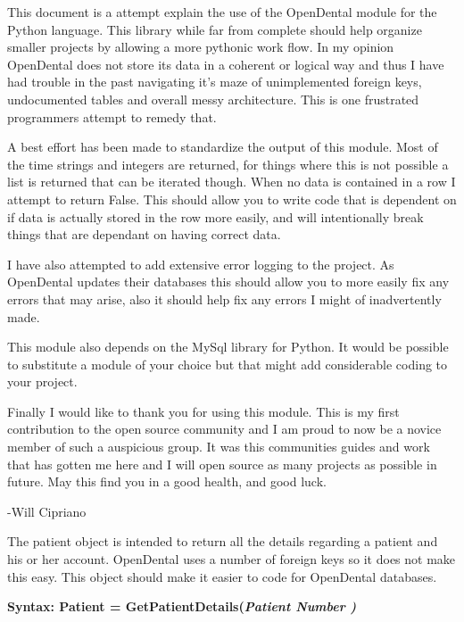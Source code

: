 \documentclass[10pt,a4paper]{article}
\begin{document}
\vspace*{\fill}
This document is a attempt explain the use of the OpenDental module for the Python language. This library while far from complete should help organize smaller projects by allowing a more pythonic work flow. In my opinion OpenDental does not store its data in a coherent or logical way and thus I have had trouble in the past navigating it's maze of unimplemented foreign keys, undocumented tables and overall messy architecture. This is one frustrated programmers attempt to remedy that.

A best effort has been made to standardize the output of this module. Most of the time strings and integers are returned, for things where this is not possible a list is returned that can be iterated though. When no data is contained in a row I attempt to return False. This should allow you to write code that is dependent on if data is actually stored in the row more easily, and will intentionally break things that are dependant on having correct data.

I have also attempted to add extensive error logging to the project. As OpenDental updates their databases this should allow you to more easily fix any errors that may arise, also it should help fix any errors I might of inadvertently made. 

This module also depends on the MySql library for Python. It would be possible to substitute a module of your choice but that might add considerable coding to your project. 

Finally I would like to thank you for using this module. This is my first contribution to the open source community and I am proud to now be a novice member of such a auspicious group. It was this communities guides and work that has gotten me here and I will open source as many projects as possible in future. May this find you in a good health, and good luck.

-Will Cipriano
\vspace{\fill}
%
\clearpage 


\begin{center}
The patient object is intended to return all the details regarding a patient and his or her account. OpenDental uses a number of foreign keys so it does not make this easy. This object should make it easier to code for OpenDental databases. 


\bf Syntax: Patient = GetPatientDetails(\it Patient Number \it )
\end{center}
\end{document}
